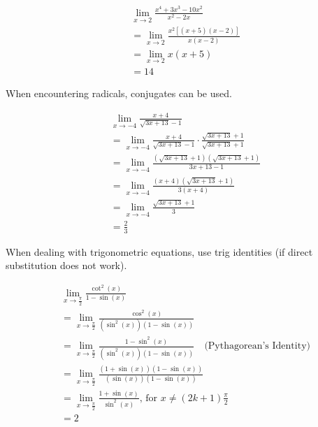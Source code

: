 \documentclass[12pt]{article}
\begin{document}
\begin{align*}
	& \lim_{x \to 2} \frac{x^4 + 3x^3 - 10x^2}{x^2 - 2x}           \\[6pt]
	& = \lim_{x \to 2} \frac{x^2\left[ (x+5)(x-2) \right]}{x(x-2)} \\
	& = \lim_{x \to 2} x(x+5)                                      \\
	& = 14
\end{align*}

\noindent When encountering radicals, conjugates can be used.

\begin{align*}
	& \lim_{x \to -4} \frac{x+4}{\sqrt{3x+13}-1}                                               \\[6pt]
	& = \lim_{x \to -4} \frac{x+4}{\sqrt{3x+13}-1} \cdot \frac{\sqrt{3x+13}+1}{\sqrt{3x+13}+1} \\[6pt]
	& = \lim_{x \to -4} \frac{(\sqrt{3x+13}+1)(\sqrt{3x+13}+1)}{3x+13-1}                       \\[6pt]
	& = \lim_{x \to -4} \frac{(x+4)(\sqrt{3x+13}+1)}{3(x+4)}                                   \\[6pt]
	& = \lim_{x \to -4} \frac{\sqrt{3x+13}+1}{3}                                               \\[6pt]
	& = \frac{2}{3}
\end{align*}

\noindent When dealing with trigonometric equations, use trig identities (if direct substitution does not work).

\begin{align*}
	& \lim_{x \to \frac{\pi}{2}} \frac{\cot^2(x)}{1-\sin(x)}                                                                                \\[6pt]
	& = \lim_{x \to \frac{\pi}{2}} \frac{\cos^2(x)}{\left( \sin^2(x) \right)\left(1-\sin(x)\right)}                                         \\[6pt]
	& = \lim_{x \to \frac{\pi}{2}} \frac{1-\sin^2(x)}{\left( \sin^2(x) \right)\left(1-\sin(x)\right)} \quad \text{(Pythagorean's Identity)} \\[6pt]
	& = \lim_{x \to \frac{\pi}{2}} \frac{\left( 1+\sin(x) \right)\left( 1-\sin(x) \right)}{\left( \sin(x) \right)\left(1-\sin(x)\right)}    \\[6pt]
	& = \lim_{x \to \frac{\pi}{2}} \frac{1+\sin(x)}{\sin^2(x)} \text{, for } x \ne (2k+1)\frac{\pi}{2}                                      \\[6pt]
	& = 2
\end{align*}
\end{document}
